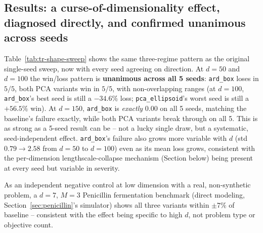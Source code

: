 \documentclass[11pt]{article}
\begin{document}
\subsection{Results: a curse-of-dimensionality effect, diagnosed directly, and confirmed unanimous across seeds}

Table~\ref{tab:tr-shape-sweep} shows the same three-regime pattern as the
original single-seed sweep, now with every seed agreeing on direction. At
$d=50$ and $d=100$ the win/loss pattern is \textbf{unanimous across all 5
seeds}: \texttt{ard\_box} loses in $5/5$, both PCA variants win in $5/5$,
with non-overlapping ranges (at $d=100$, \texttt{ard\_box}'s best seed is
still a $-34.6\%$ loss; \texttt{pca\_ellipsoid}'s worst seed is still a
$+56.5\%$ win). At $d=150$, \texttt{ard\_box} is \emph{exactly} $0.00$ on
all 5 seeds, matching the baseline's failure exactly, while both PCA
variants break through on all 5. This is as strong as a 5-seed result can
be -- not a lucky single draw, but a systematic, seed-independent effect.
\texttt{ard\_box}'s failure also grows more variable with $d$ (std
$0.79 \to 2.58$ from $d{=}50$ to $d{=}100$) even as its mean loss grows,
consistent with the per-dimension lengthscale-collapse mechanism
(Section below) being present at every seed but variable in severity.

As an independent negative control at low dimension with a real,
non-synthetic problem, a $d=7$, $M=3$ Penicillin fermentation benchmark
(direct modeling, Section~\ref{sec:penicillin}'s simulator) shows all three
variants within $\pm 7\%$ of baseline -- consistent with the effect being
specific to high $d$, not problem type or objective count.
\end{document}
